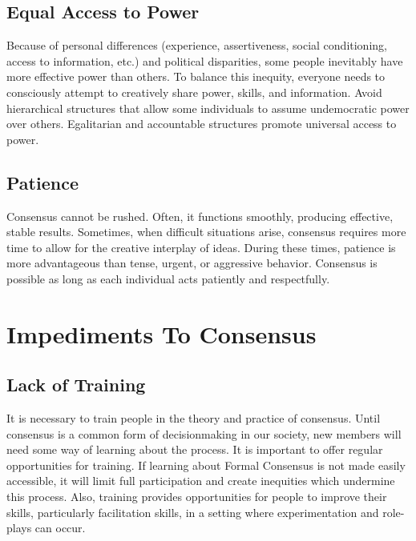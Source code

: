 \subsection*{Equal Access to Power}

Because of personal differences (experience, assertiveness, social conditioning, access to information, etc.) and political disparities, some people inevitably have more effective power than others. To balance this inequity, everyone needs to consciously attempt to creatively share power, skills, and information. Avoid hierarchical structures that allow some individuals to assume undemocratic power over others. Egalitarian and accountable structures promote universal access to power.

\subsection*{Patience}

Consensus cannot be rushed. Often, it functions smoothly, producing effective, stable results. Sometimes, when difficult situations arise, consensus requires more time to allow for the creative interplay of ideas. During these times, patience is more advantageous than tense, urgent, or aggressive behavior. Consensus is possible as long as each individual acts patiently and respectfully.

\section{Impediments To Consensus}
\subsection*{Lack of Training}

It is necessary to train people in the theory and practice of consensus. Until consensus is a common form of decisionmaking in our society, new members will need some way of learning about the process. It is important to offer regular opportunities for training. If learning about Formal Consensus is not made easily accessible, it will limit full participation and create inequities which undermine this process. Also, training provides opportunities for people to improve their skills, particularly facilitation skills, in a setting where experimentation and role-plays can occur.

